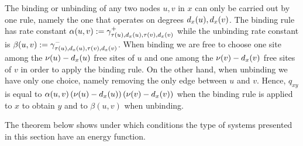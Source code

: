 The binding or unbinding of any two nodes $u,v$ in $x$
can only be carried out by one rule,
namely the one that operates on degrees $d_x(u),d_x(v)$.
The binding rule has rate constant
$\alpha(u,v) := \gamma^+_{\tau(u),d_x(u),\tau(v),d_x(v)}$
while the unbinding rate constant is
$\beta(u,v) := \gamma^-_{\tau(u),d_x(u),\tau(v),d_x(v)}$.
When binding we are free to choose
one site among the $\nu(u)-d_x(u)$ free sites of $u$
and one among the $\nu(v)-d_x(v)$ free sites of $v$
in order to apply the binding rule.
On the other hand, when unbinding we have only one choice,
namely removing the only edge between $u$ and $v$.
Hence, $q_{xy}$ is equal to $\alpha(u,v) \,
(\nu(u) - d_x(u)) \, (\nu(v) - d_x(v))$
when the binding rule is applied to $x$ to obtain $y$
and to $\beta(u,v)$
when unbinding.

The theorem below shows under which conditions
the type of systems presented in this section
have an energy function.

